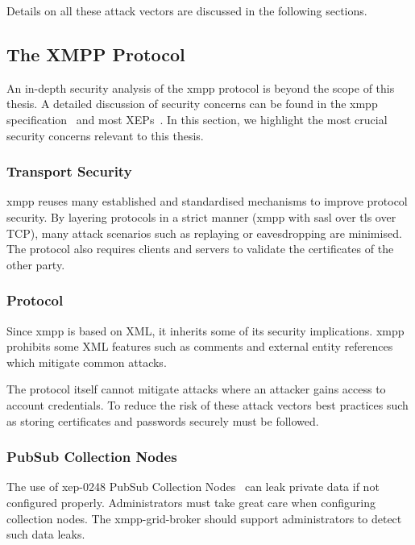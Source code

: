 Details on all these attack vectors are discussed in the following sections.

\subsection{The XMPP Protocol}

An in-depth security analysis of the \gls{xmpp} protocol is beyond the scope of this thesis.
A detailed discussion of security concerns can be found in the \gls{xmpp} specification~\cite{rfc6120} and most XEPs~\cite{xep-0060}\cite{xep-0248}.
In this section, we highlight the most crucial security concerns relevant to this thesis.

\subsubsection{Transport Security}

\gls{xmpp} reuses many established and standardised mechanisms to improve protocol security.
By layering protocols in a strict manner (\gls{xmpp} with \gls{sasl} over \gls{tls} over TCP), many attack scenarios such as replaying or eavesdropping are minimised.
The protocol also requires clients and servers to validate the certificates of the other party.~\cite{rfc7590}\cite{rfc6120}

\subsubsection{Protocol}

Since \gls{xmpp} is based on XML, it inherits some of its security implications.
\gls{xmpp} prohibits some XML features such as comments and external entity references which mitigate common attacks.~\cite{rfc6120}

The protocol itself cannot mitigate attacks where an attacker gains access to account credentials.
To reduce the risk of these attack vectors best practices such as storing certificates and passwords securely must be followed.

\subsubsection{PubSub Collection Nodes}

The use of \gls{xep}-0248 PubSub Collection Nodes~\cite{xep-0248} can leak private data if not configured properly.
Administrators must take great care when configuring collection nodes.
The \gls{xmpp-grid-broker} should support administrators to detect such data leaks.

